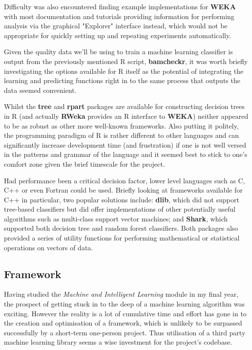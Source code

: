 Difficulty was also encountered finding example implementations for \textbf{WEKA}
with most documentation and tutorials providing information for performing
analysis via the graphical "Explorer" interface instead, which would not be
appropriate for quickly setting up and repeating experiments automatically.

Given the quality data we'll be using to train a machine learning classifier is
output from the previously mentioned R script, \textbf{bamcheckr}, it was worth
briefly investigating the options available for R itself as the potential of
integrating the learning and predicting functions right in to the same process
that outputs the data seemed convenient.

Whilst the \textbf{tree}\citep{man:rtree} and \textbf{rpart}\citep{man:rpart}
packages are available for constructing decision trees in R (and actually
\textbf{RWeka} provides an R interface to \textbf{WEKA}) neither appeared to be
as robust as other more well-known frameworks. Also putting it politely, the
programming paradigm of R\citep{man:R} is rather different to other languages
and can significantly increase development time (and frustration\citep{argh}) if
one is not well versed in the patterns and grammar of the language  and it
seemed best to stick to one's comfort zone given the brief timescale for the
project.

Had performance been a critical decision factor, lower level languages such as
C, C++ or even Fortran could be used. Briefly looking at frameworks available
for C++ in particular, two popular solutions include: \textbf{dlib}\citep{dlib},
which did not support tree-based classifiers but did offer implementations of
other potentially useful algorithms such as multi-class support vector machines;
and \textbf{Shark}\citep{shark}, which supported both decision tree and random
forest classifiers. Both packages also provided a series of utility functions
for performing mathematical or statistical operations on vectors of data.


\subsection{Framework}

Having studied the \textit{Machine and Intelligent Learning} module in my final
year, the prospect of getting stuck in to the deep of a machine learning
algorithm was exciting. However the reality is a lot of cumulative time and
effort has gone in to the creation and optimisation of a framework, which is
unlikely to be surpassed successfully by a short-term one-person project. Thus
utilisation of a third party machine learning library seems a wise investment
for the project's codebase.

